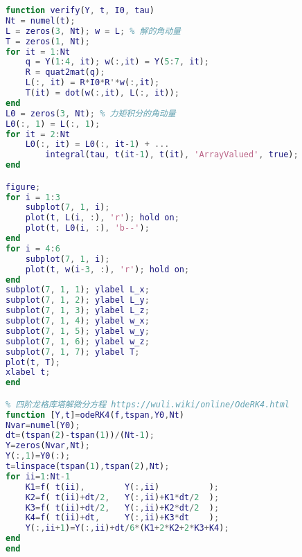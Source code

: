 \begin{lstlisting}[language=matlab, caption=rigBdRot.m]
% 验证角动量定理
function verify(Y, t, I0, tau)
Nt = numel(t);
L = zeros(3, Nt); w = L; % 解的角动量
T = zeros(1, Nt);
for it = 1:Nt
    q = Y(1:4, it); w(:,it) = Y(5:7, it);
    R = quat2mat(q);
    L(:, it) = R*I0*R'*w(:,it);
    T(it) = dot(w(:,it), L(:, it));
end
L0 = zeros(3, Nt); % 力矩积分的角动量
L0(:, 1) = L(:, 1);
for it = 2:Nt
    L0(:, it) = L0(:, it-1) + ...
        integral(tau, t(it-1), t(it), 'ArrayValued', true);
end

figure;
for i = 1:3
    subplot(7, 1, i);
    plot(t, L(i, :), 'r'); hold on;
    plot(t, L0(i, :), 'b--');
end
for i = 4:6
    subplot(7, 1, i);
    plot(t, w(i-3, :), 'r'); hold on;
end
subplot(7, 1, 1); ylabel L_x;
subplot(7, 1, 2); ylabel L_y;
subplot(7, 1, 3); ylabel L_z;
subplot(7, 1, 4); ylabel w_x;
subplot(7, 1, 5); ylabel w_y;
subplot(7, 1, 6); ylabel w_z;
subplot(7, 1, 7); ylabel T;
plot(t, T);
xlabel t;
end

% 四阶龙格库塔解微分方程 https://wuli.wiki/online/OdeRK4.html
function [Y,t]=odeRK4(f,tspan,Y0,Nt)
Nvar=numel(Y0);
dt=(tspan(2)-tspan(1))/(Nt-1);
Y=zeros(Nvar,Nt);
Y(:,1)=Y0(:);
t=linspace(tspan(1),tspan(2),Nt);
for ii=1:Nt-1
    K1=f( t(ii),        Y(:,ii)          );
    K2=f( t(ii)+dt/2,   Y(:,ii)+K1*dt/2  );
    K3=f( t(ii)+dt/2,   Y(:,ii)+K2*dt/2  );
    K4=f( t(ii)+dt,     Y(:,ii)+K3*dt    );
    Y(:,ii+1)=Y(:,ii)+dt/6*(K1+2*K2+2*K3+K4);
end
end
\end{lstlisting}

